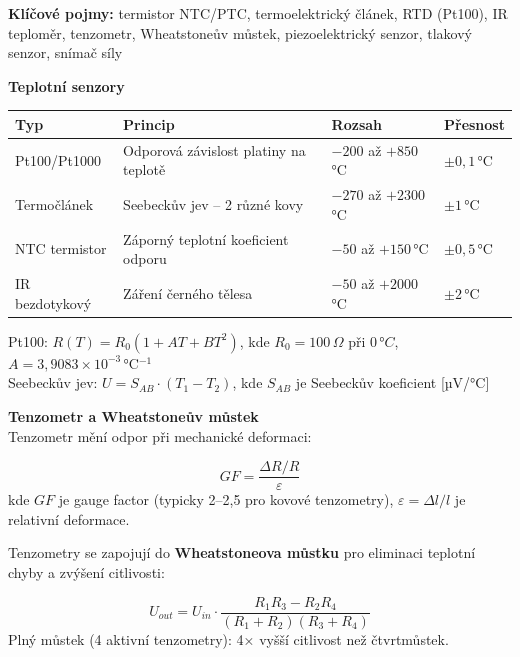 \documentclass[a4paper,10pt]{article}
\begin{document}
\begin{pojmybox}
\textbf{Klíčové pojmy:}
termistor NTC/PTC, termoelektrický článek, RTD (Pt100),
IR teploměr, tenzometr, Wheatstoneův můstek, piezoelektrický senzor,
tlakový senzor, snímač síly
\end{pojmybox}

\begin{vysvetlenibox}
\textbf{Teplotní senzory}

\begin{center}
\begin{tabularx}{0.95\linewidth}{@{} l X l l @{}}
    \toprule
    \textbf{Typ} & \textbf{Princip} & \textbf{Rozsah} & \textbf{Přesnost} \\
    \midrule
    Pt100/Pt1000 & Odporová závislost platiny na teplotě & $-200$ až $+850$\,°C & $\pm0{,}1$\,°C \\
    Termočlánek & Seebeckův jev -- 2 různé kovy & $-270$ až $+2300$\,°C & $\pm1$\,°C \\
    NTC termistor & Záporný teplotní koeficient odporu & $-50$ až $+150$\,°C & $\pm0{,}5$\,°C \\
    IR bezdotykový & Záření černého tělesa & $-50$ až $+2000$\,°C & $\pm2$\,°C \\
    \bottomrule
\end{tabularx}
\end{center}

\begin{vzorcebox}
Pt100: $R(T) = R_0 \left(1 + AT + BT^2\right)$,
kde $R_0 = 100\,\Omega$ při $0\,°C$, $A = 3{,}9083\times10^{-3}$\,°C$^{-1}$\\
Seebeckův jev: $U = S_{AB} \cdot (T_1 - T_2)$,
kde $S_{AB}$ je Seebeckův koeficient [µV/°C]
\end{vzorcebox}

\textbf{Tenzometr a Wheatstoneův můstek}\\
Tenzometr mění odpor při mechanické deformaci:

\begin{vzorcebox}
$$GF = \frac{\Delta R / R}{\varepsilon}$$
kde $GF$ je gauge factor (typicky 2--2,5 pro kovové tenzometry),
$\varepsilon = \Delta l / l$ je relativní deformace.
\end{vzorcebox}

Tenzometry se zapojují do \textbf{Wheatstoneova můstku} pro eliminaci
teplotní chyby a zvýšení citlivosti:

\begin{vzorcebox}
$$U_{out} = U_{in} \cdot \frac{R_1 R_3 - R_2 R_4}{(R_1+R_2)(R_3+R_4)}$$
Plný můstek (4 aktivní tenzometry): 4× vyšší citlivost než čtvrtmůstek.
\end{vzorcebox}


\end{vysvetlenibox}
\end{document}
